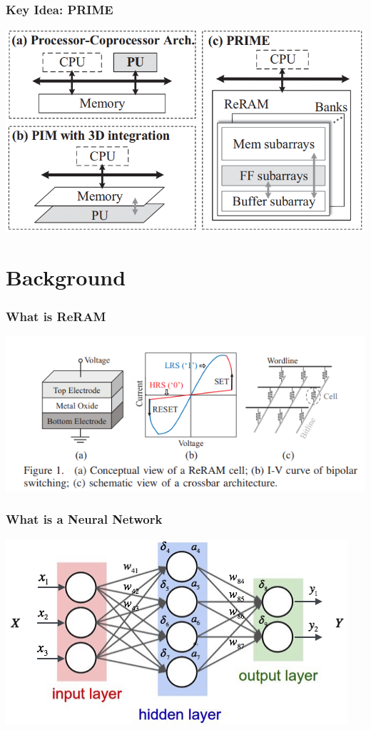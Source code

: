 \documentclass[hyperref={colorlinks}]{beamer}
\begin{document}
\begin{frame}
	\frametitle{Key Idea: PRIME}
	\includegraphics[scale=0.4]{keyIdea.png}
\end{frame}

\section{Background}
\begin{frame}
	\frametitle{What is ReRAM}
	\includegraphics[scale=0.5]{reram.png}
\end{frame}

\begin{frame}
	\frametitle{What is a Neural Network}
	\includegraphics[scale=0.6]{nn.png}
\end{frame}
\end{document}

